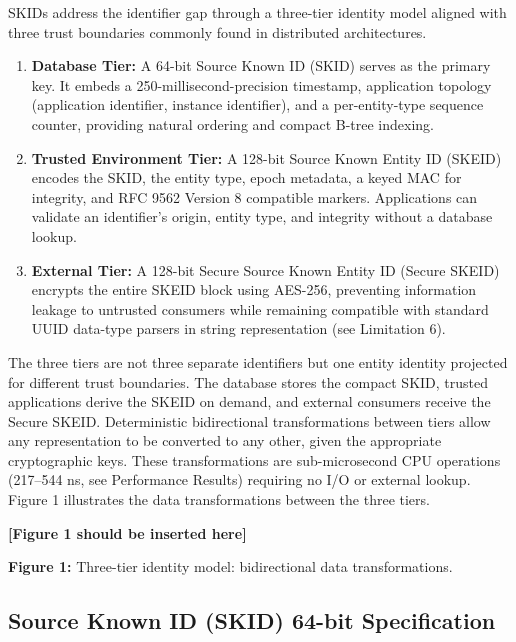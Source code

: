 \documentclass[fleqn,10pt,lineno]{wlpeerj}
\begin{document}
SKIDs address the identifier gap through a three-tier identity model
aligned with three trust boundaries commonly found in distributed
architectures.

\begin{enumerate}
\def\labelenumi{\arabic{enumi}.}
\item
  \textbf{Database Tier:} A 64-bit Source Known ID (SKID) serves as the
  primary key. It embeds a 250-millisecond-precision timestamp,
  application topology (application identifier, instance identifier),
  and a per-entity-type sequence counter, providing natural ordering and
  compact B-tree indexing.
\item
  \textbf{Trusted Environment Tier:} A 128-bit Source Known Entity ID
  (SKEID) encodes the SKID, the entity type, epoch metadata, a keyed MAC
  for integrity, and RFC 9562 Version 8 compatible markers. Applications
  can validate an identifier's origin, entity type, and integrity
  without a database lookup.
\item
  \textbf{External Tier:} A 128-bit Secure Source Known Entity ID
  (Secure SKEID) encrypts the entire SKEID block using AES-256,
  preventing information leakage to untrusted consumers while remaining
  compatible with standard UUID data-type parsers in string
  representation (see Limitation 6).
\end{enumerate}

The three tiers are not three separate identifiers but one entity
identity projected for different trust boundaries. The database stores
the compact SKID, trusted applications derive the SKEID on demand, and
external consumers receive the Secure SKEID. Deterministic bidirectional
transformations between tiers allow any representation to be converted
to any other, given the appropriate cryptographic keys. These
transformations are sub-microsecond CPU operations (217--544 ns, see
Performance Results) requiring no I/O or external lookup. Figure 1
illustrates the data transformations between the three tiers.

\textbf{{[}Figure 1 should be inserted here{]}}

\textbf{Figure 1:} Three-tier identity model: bidirectional data
transformations.

\subsection{Source Known ID (SKID) 64-bit
Specification}\label{source-known-id-skid-64-bit-specification}
\end{document}
